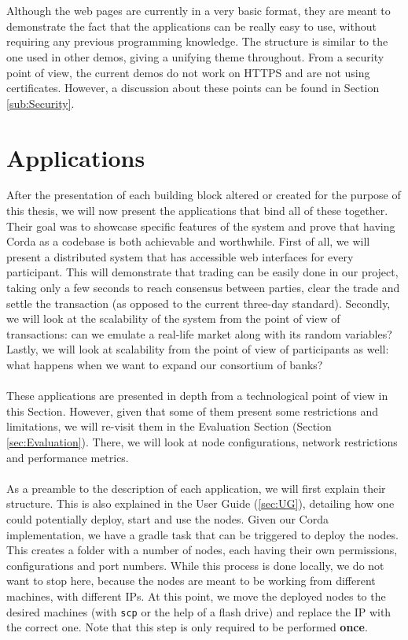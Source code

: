 \documentclass[12pt,twoside]{article}
\begin{document}
\\ \\
Although the web pages are currently in a very basic format, they are meant to demonstrate the fact that the applications can be really easy to use, without requiring any previous programming knowledge. The structure is similar to the one used in other demos, giving a unifying theme throughout. From a security point of view, the current demos do not work on HTTPS and are not using certificates. However, a discussion about these points can be found in Section \ref{sub:Security}.
\cleardoublepage
\section{Applications}
\label{sub:apps}
After the presentation of each building block altered or created for the purpose of this thesis, we will now present the applications that bind all of these together. Their goal was to showcase specific features of the system and prove that having Corda as a codebase is both achievable and worthwhile. First of all, we will present a distributed system that has accessible web interfaces for every participant. This will demonstrate that trading can be easily done in our project, taking only a few seconds to reach consensus between parties, clear the trade and settle the transaction (as opposed to the current three-day standard). Secondly, we will look at the scalability of the system from the point of view of transactions: can we emulate a real-life market along with its random variables? Lastly, we will look at scalability from the point of view of participants as well: what happens when we want to expand our consortium of banks? 
\\ \\
These applications are presented in depth from a technological point of view in this Section. However, given that some of them present some restrictions and limitations, we will re-visit them in the Evaluation Section (Section \ref{sec:Evaluation}). There, we will look at node configurations, network restrictions and performance metrics.
\\ \\
As a preamble to the description of each application, we will first explain their structure. This is also explained in the User Guide (\ref{sec:UG}), detailing how one could potentially deploy, start and use the nodes. Given our Corda implementation, we have a gradle task that can be triggered to deploy the nodes. This creates a folder with a number of nodes, each having their own permissions, configurations and port numbers. While this process is done locally, we do not want to stop here, because the nodes are meant to be working from different machines, with different IPs. At this point, we move the deployed nodes to the desired machines (with \verb|scp| or the help of a flash drive) and replace the IP with the correct one. Note that this step is only required to be performed \textbf{once}.
\end{document}
